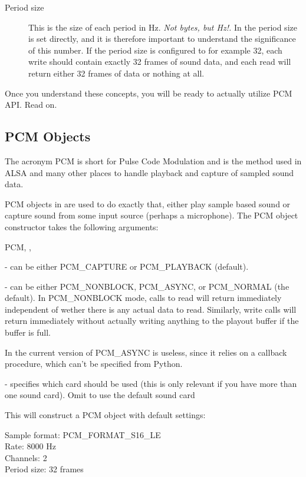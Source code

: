 \begin{description}
\item[Period size] This is the size of each period in Hz. \emph{Not
    bytes, but Hz!.} In  the period size is set
  directly, and it is therefore important to understand the
  significance of this number. If the period size is configured to for
  example 32, each write should contain exactly 32 frames of sound
  data, and each read will return either 32 frames of data or nothing
  at all.

\end{description}

Once you understand these concepts, you will be ready to actually
utilize PCM API. Read on.

\subsection{PCM Objects}
\label{pcm-objects}

The acronym PCM is short for Pulse Code Modulation and is the method
used in ALSA and many other places to handle playback and capture of
sampled sound data.

PCM objects in  are used to do exactly that, either
play sample based sound or capture sound from some input source
(perhaps a microphone). The PCM object constructor takes the following
arguments:

\begin{classdesc}{PCM}{, , }

 - can be either PCM_CAPTURE or PCM_PLAYBACK (default).

 - can be either PCM_NONBLOCK, PCM_ASYNC, or PCM_NORMAL (the
default).  In PCM_NONBLOCK mode, calls to read will return immediately
independent of wether there is any actual data to read. Similarly,
write calls will return immediately without actually writing anything
to the playout buffer if the buffer is full.

In the current version of  PCM_ASYNC is useless,
since it relies on a callback procedure, which can't be specified from
Python.

 - specifies which card should be used (this is only
relevant if you have more than one sound card). Omit to use the
default sound card

This will construct a PCM object with default settings:

Sample format: PCM_FORMAT_S16_LE \\
Rate: 8000 Hz \\
Channels: 2 \\
Period size: 32 frames \\
\end{classdesc}

